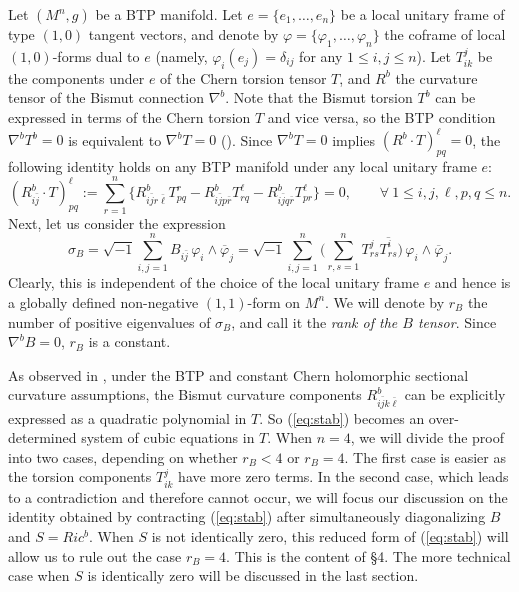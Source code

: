 \documentclass{amsart}
\begin{document}
Let $(M^n,g)$ be a BTP manifold. Let $e=\{ e_1, \ldots , e_n\}$ be a local unitary frame of type $(1,0)$ tangent vectors, and denote by  $\varphi =\{ \varphi_1, \ldots , \varphi_n\}$ the coframe of local $(1,0)$-forms dual to $e$ (namely, $\varphi_i(e_j)=\delta_{ij}$ for any $1\leq i,j\leq n$). Let $T^j_{ik}$ be the components under $e$ of the Chern torsion tensor $T$, and $R^b$ the curvature tensor of the Bismut connection $\nabla^b$. Note that the Bismut torsion $T^b$ can be expressed in terms of the Chern torsion $T$ and vice versa, so the BTP condition $\nabla^bT^b=0$ is equivalent to $\nabla^bT=0$ (\cite{ZhaoZ24}). Since $\nabla^bT=0$ implies $(R^b\cdot T)^{\ell}_{pq}=0$, the following identity holds on any BTP manifold under any local unitary frame $e$:
\begin{equation}  \label{eq:stab}
 (R^b_{i\bar{j}}\cdot T)^{\ell}_{pq} := \sum_{r=1}^n \big\{ R^b_{i\bar{j}r\bar{\ell}}T^r_{pq} - R^b_{i\bar{j}p\bar{r}}T^{\ell}_{rq} - R^b_{i\bar{j}q\bar{r}}T^{\ell}_{pr} \big\} =0, \ \ \ \ \ \ \ \ \ \forall \ 1\leq i,j,\ell , p, q \leq n.
 \end{equation}
Next, let us consider the expression
\begin{equation}
\sigma_B=\sqrt{-1}\sum_{i,j=1}^n B_{i\bar{j}} \,\varphi_i \wedge \overline{\varphi}_j =\sqrt{-1}\sum_{i,j=1}^n \big( \sum_{r,s=1}^nT^j_{rs} \overline{T^i_{rs}} \big) \,\varphi_i \wedge \overline{\varphi}_j.
\end{equation}
Clearly, this is independent of the choice of the local unitary frame $e$ and hence is a globally defined non-negative $(1,1)$-form on $M^n$. We will denote by $r_B$ the number of positive eigenvalues of $\sigma_B$, and call it the {\em rank of the $B$ tensor}. Since $\nabla^bB=0$, $r_B$ is a constant.

As observed in \cite{ChenZ26}, under the BTP and constant Chern holomorphic sectional curvature assumptions, the Bismut curvature components $R^b_{i\bar{j}k\bar{\ell}}$ can be explicitly expressed as a quadratic polynomial in $T$. So (\ref{eq:stab}) becomes an over-determined system of cubic equations in $T$. When $n=4$, we will divide the proof  into two cases, depending on whether $r_B<4$ or $r_B=4$. The first case is easier as the torsion components $T^j_{ik}$ have more zero terms. In the second case, which leads to a contradiction and therefore cannot occur, we will focus our discussion on the identity obtained by contracting (\ref{eq:stab}) after simultaneously diagonalizing $B$ and $S=Ric^b$. When $S$ is not identically zero, this reduced form of (\ref{eq:stab}) will allow us to rule out the case $r_B=4$. This is the content of \S 4. The more technical case when $S$ is identically zero will be  discussed in the last section.
\end{document}
